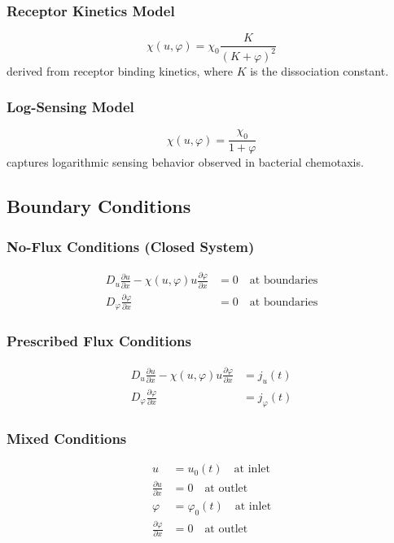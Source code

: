 \documentclass[11pt,a4paper]{article}
\begin{document}
\subsubsection{Receptor Kinetics Model}
\begin{equation}
\chi(u,\varphi) = \chi_0 \frac{K}{(K + \varphi)^2}
\end{equation}
derived from receptor binding kinetics, where $K$ is the dissociation constant.

\subsubsection{Log-Sensing Model}
\begin{equation}
\chi(u,\varphi) = \frac{\chi_0}{1 + \varphi}
\end{equation}
captures logarithmic sensing behavior observed in bacterial chemotaxis.

\subsection{Boundary Conditions}

\subsubsection{No-Flux Conditions (Closed System)}
\begin{align}
D_u \frac{\partial u}{\partial x} - \chi(u,\varphi) u \frac{\partial \varphi}{\partial x} &= 0 \quad \text{at boundaries}\\
D_\varphi \frac{\partial \varphi}{\partial x} &= 0 \quad \text{at boundaries}
\end{align}

\subsubsection{Prescribed Flux Conditions}
\begin{align}
D_u \frac{\partial u}{\partial x} - \chi(u,\varphi) u \frac{\partial \varphi}{\partial x} &= j_u(t)\\
D_\varphi \frac{\partial \varphi}{\partial x} &= j_\varphi(t)
\end{align}

\subsubsection{Mixed Conditions}
\begin{align}
u &= u_0(t) \quad \text{at inlet}\\
\frac{\partial u}{\partial x} &= 0 \quad \text{at outlet}\\
\varphi &= \varphi_0(t) \quad \text{at inlet}\\
\frac{\partial \varphi}{\partial x} &= 0 \quad \text{at outlet}
\end{align}
\end{document}

